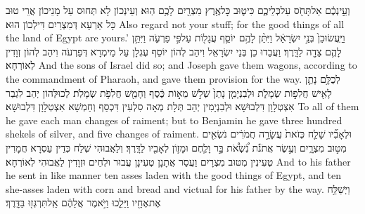 {וְעֵ֣ינְכֶ֔ם אַל\maqqaf תָּחֹ֖ס עַל\maqqaf כְּלֵיכֶ֑ם כִּי\maqqaf ט֛וּב כׇּל\maqqaf אֶ֥רֶץ מִצְרַ֖יִם לָכֶ֥ם הֽוּא׃}
{וְעֵינְכוֹן לָא תְּחוּס עַל מָנֵיכוֹן אֲרֵי טוּב כָּל אַרְעָא דְּמִצְרַיִם דִּילְכוֹן הוּא׃}
{Also regard not your stuff; for the good things of all the land of Egypt are yours.’}{}
{וַיַּֽעֲשׂוּ\maqqaf כֵן֙ בְּנֵ֣י יִשְׂרָאֵ֔ל וַיִּתֵּ֨ן לָהֶ֥ם יוֹסֵ֛ף עֲגָל֖וֹת עַל\maqqaf פִּ֣י פַרְעֹ֑ה וַיִּתֵּ֥ן לָהֶ֛ם צֵדָ֖ה לַדָּֽרֶךְ׃}
{וַעֲבַדוּ כֵן בְּנֵי יִשְׂרָאֵל וִיהַב לְהוֹן יוֹסֵף עֶגְלָן עַל מֵימְרָא דְּפַרְעֹה וִיהַב לְהוֹן זְוָדִין לְאוֹרְחָא׃}
{And the sons of Israel did so; and Joseph gave them wagons, according to the commandment of Pharaoh, and gave them provision for the way.}{}
{לְכֻלָּ֥ם נָתַ֛ן לָאִ֖ישׁ חֲלִפ֣וֹת שְׂמָלֹ֑ת וּלְבִנְיָמִ֤ן נָתַן֙ שְׁלֹ֣שׁ מֵא֣וֹת כֶּ֔סֶף וְחָמֵ֖שׁ חֲלִפֹ֥ת שְׂמָלֹֽת׃}
{לְכוּלְּהוֹן יְהַב לִגְבַר אִצְטְלָוָן דִּלְבוּשָׁא וּלְבִנְיָמִין יְהַב תְּלָת מְאָה סִלְעִין דִּכְסַף וְחַמְשָׁא אִצְטְלָוָן דִּלְבוּשָׁא׃}
{To all of them he gave each man changes of raiment; but to Benjamin he gave three hundred shekels of silver, and five changes of raiment.}{}
{וּלְאָבִ֞יו שָׁלַ֤ח כְּזֹאת֙ עֲשָׂרָ֣ה חֲמֹרִ֔ים נֹשְׂאִ֖ים מִטּ֣וּב מִצְרָ֑יִם וְעֶ֣שֶׂר אֲתֹנֹ֡ת נֹֽ֠שְׂאֹ֠ת בָּ֣ר וָלֶ֧חֶם וּמָז֛וֹן לְאָבִ֖יו לַדָּֽרֶךְ׃}
{וְלַאֲבוּהִי שְׁלַח כְּדֵין עַסְרָא חֲמָרִין טְעִינִין מִטּוּב מִצְרָיִם וַעֲסַר אֲתָנָן טְעִינָן עֲבוּר וּלְחֵים וּזְוָדִין לַאֲבוּהִי לְאוֹרְחָא׃}
{And to his father he sent in like manner ten asses laden with the good things of Egypt, and ten she-asses laden with corn and bread and victual for his father by the way.}{}
{וַיְשַׁלַּ֥ח אֶת\maqqaf אֶחָ֖יו וַיֵּלֵ֑כוּ וַיֹּ֣אמֶר אֲלֵהֶ֔ם אַֽל\maqqaf תִּרְגְּז֖וּ בַּדָּֽרֶךְ׃}
